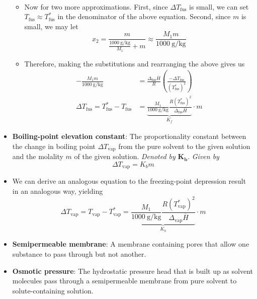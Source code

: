 \documentclass[../notes.tex]{subfiles}
\begin{document}
\begin{itemize}
\begin{itemize}
\begin{align*}
        \end{align*}
        \item Now for two more approximations. First, since $\Delta T_\text{fus}$ is small, we can set $T_\text{fus}\approx T_\text{fus}^*$ in the denominator of the above equation. Second, since $m$ is small, we may let
        \begin{equation*}
            x_2 = \frac{m}{\frac{\SI{1000}{\gram\per\kilo\gram}}{M_1}+m}
            \approx \frac{M_1m}{\SI{1000}{\gram\per\kilo\gram}}
        \end{equation*}
        \item Therefore, making the substitutions and rearranging the above gives us
        \begin{align*}
            -\frac{M_1m}{\SI{1000}{\gram\per\kilo\gram}} &= \frac{\Delta_\text{fus}\overline{H}}{R}\left( \frac{-\Delta T_\text{fus}}{(T_\text{fus}^*)^2} \right)\\
            \Delta T_\text{fus} = T_\text{fus}^*-T_\text{fus} &= \underbrace{\frac{M_1}{\SI{1000}{\gram\per\kilo\gram}}\frac{R(T_\text{fus}^*)^2}{\Delta_\text{fus}\overline{H}}}_{K_f}\cdot m
        \end{align*}
    \end{itemize}
    \item \textbf{Boiling-point elevation constant}: The proportionality constant between the change in boiling point $\Delta T_\text{vap}$ from the pure solvent to the given solution and the molality $m$ of the given solution. \emph{Denoted by} $\bm{K_b}$. \emph{Given by}
    \begin{equation*}
        \Delta T_\text{vap} = K_bm
    \end{equation*}
    \item We can derive an analogous equation to the freezing-point depression result in an analogous way, yielding
    \begin{equation*}
        \Delta T_\text{vap} = T_\text{vap}-T_\text{vap}^* = \underbrace{\frac{M_1}{\SI{1000}{\gram\per\kilo\gram}}\frac{R(T_\text{vap}^*)^2}{\Delta_\text{vap}\overline{H}}}_{K_b}\cdot m
    \end{equation*}
    \item \textbf{Semipermeable membrane}: A membrane containing pores that allow one substance to pass through but not another.
    \item \textbf{Osmotic pressure}: The hydrostatic pressure head that is built up as solvent molecules pass through a semipermeable membrane from pure solvent to solute-containing solution.

\end{itemize}
\end{document}
